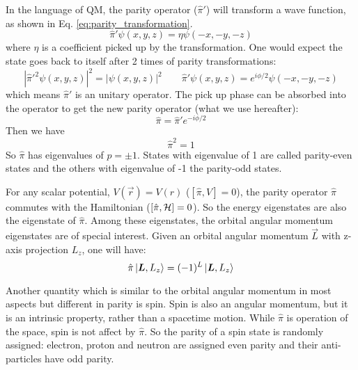 In the language of QM, the parity operator ($\hat{\pi}'$) will transform 
a wave function, as shown in Eq. \ref{eq:parity_transformation}.
\begin{equation}
    \hat{\pi}'\psi(x, y, z) = \eta \psi(-x, -y, -z)
    \label{eq:parity_transformation}
\end{equation}
where $\eta$ is a coefficient picked up by the transformation. One would expect
the state goes back to itself after 2 times of parity transformations:
\begin{equation}
    |\hat{\pi}'^2 \psi(x, y, z)|^2 = |\psi(x, y, z)|^2
    \qquad
    \hat{\pi}'\psi(x, y, z) = e^{i\phi/2}\psi(-x, -y, -z)
\end{equation}
which means $\hat{\pi}'$ is an unitary operator. The pick up phase can
be absorbed into the operator to get the new parity operator (what we use hereafter): 
\begin{equation}
    \hat{\pi} = \hat{\pi}'e^{-i\phi/2}
\end{equation}
Then we have
\begin{equation}
    \hat{\pi}^2 = 1 
\end{equation}
So $\hat{\pi}$ has eigenvalues of $p = \pm 1$. States with eigenvalue of 1 are called
parity-even states and the others with eigenvalue of -1 the parity-odd states.

For any scalar potential, $V(\vec{r}) = V(r)$ ($[\hat{\pi}, V] = 0$), the parity 
operator $\hat{\pi}$ commutes with the Hamiltonian ($[\hat{\pi}, \mathcal{H}] = 0$). 
So the energy eigenstates are also the eigenstate
of $\hat{\pi}$. Among these eigenstates, the orbital angular momentum eigenstates are
of special interest. Given an orbital angular momentum $\vec{L}$ with z-axis projection
$L_z$, one will have:
\begin{equation}
    \hat{\pi}\ket{\boldsymbol{L}, L_z} = (-1)^L\ket{\boldsymbol{L}, L_z}
\end{equation}

Another quantity which is similar to the orbital angular momentum in most aspects but
different in parity is spin. Spin is also an angular momentum, but it is an 
intrinsic property, rather than a spacetime motion. While $\hat{\pi}$ is operation
of the space, spin is not affect by $\hat{\pi}$. So the parity of a spin state
is randomly assigned: electron, proton and neutron are assigned even parity and
their anti-particles have odd parity.

